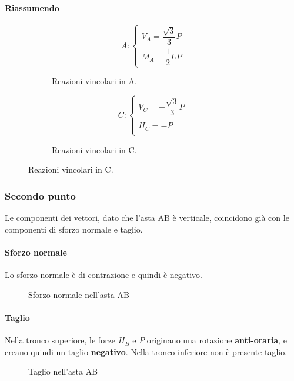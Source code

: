 \documentclass[main.tex]{subfiles}
\begin{document}
\paragraph{Riassumendo}

\begin{figure}[H]
  \begin{subfigure}[b]{.5\textwidth}
  \centering
  \[
  	A: \begin{cases}
		V_A = \dfrac{\sqrt{3}}{3}P\\
		M_A = \dfrac{1}{2}LP
  	\end{cases}
  \]
  \caption{Reazioni vincolari in A.}
  \end{subfigure}
  \hfill
  \begin{subfigure}[b]{.5\textwidth}
  \centering
  \[
  	C: \begin{cases}
  		V_C = -\dfrac{\sqrt{3}}{3}P\\\\
  		H_C = -P\\
  	\end{cases}
  \]
  \caption{Reazioni vincolari in C.}
  \end{subfigure}
\end{figure}


\subsubsection{Secondo punto}
Le componenti dei vettori, dato che l'asta AB è 	verticale, coincidono già con le componenti di sforzo normale e taglio.

\paragraph{Sforzo normale}
Lo sforzo normale è di contrazione e quindi è negativo.

\begin{figure}[H]
\centering
\resizebox{.25\textwidth}{!}{}
\caption{Sforzo normale nell'asta AB}
\end{figure}

\paragraph{Taglio}
Nella tronco superiore, le forze $H_B$ e $P$ originano una rotazione \textbf{anti-oraria}, e creano quindi un taglio \textbf{negativo}. Nella tronco inferiore non è presente taglio.

\begin{figure}[H]
\centering
\resizebox{.25\textwidth}{!}{}
\caption{Taglio nell'asta AB}
\end{figure}
\end{document}

